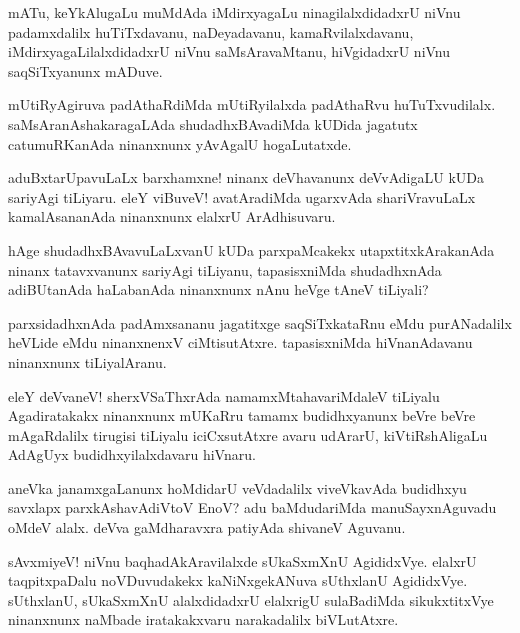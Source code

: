\begin{mng}
mATu, keYkAlugaLu muMdAda iMdirxyagaLu ninagilalxdidadxrU niVnu padamxdalilx huTiTxdavanu, naDeyadavanu, kamaRvilalxdavanu, iMdirxyagaLilalxdidadxrU niVnu saMsAravaMtanu, hiVgidadxrU niVnu saqSiTxyanunx mADuve.
\end{mng}

\begin{mng}
mUtiRyAgiruva padAthaRdiMda mUtiRyilalxda padAthaRvu huTuTxvudilalx. saMsAranAshakaragaLAda shudadhxBAvadiMda kUDida jagatutx catumuRKanAda ninanxnunx yAvAgalU hogaLutatxde.
\end{mng}

\begin{mng}
aduBxtarUpavuLaLx barxhamxne! ninanx deVhavanunx deVvAdigaLU kUDa sariyAgi tiLiyaru. eleY viBuveV! avatAradiMda ugarxvAda shariVravuLaLx kamalAsananAda ninanxnunx elalxrU ArAdhisuvaru.
\end{mng}

\begin{mng}
hAge shudadhxBAvavuLaLxvanU kUDa parxpaMcakekx utapxtitxkArakanAda ninanx tatavxvanunx sariyAgi tiLiyanu, tapasisxniMda shudadhxnAda adiBUtanAda haLabanAda ninanxnunx nAnu heVge tAneV tiLiyali?
\end{mng}

\begin{mng}
parxsidadhxnAda padAmxsananu jagatitxge saqSiTxkataRnu eMdu purANadalilx heVLide eMdu ninanxnenxV ciMtisutAtxre. tapasisxniMda hiVnanAdavanu ninanxnunx tiLiyalAranu.
\end{mng}

\begin{mng}
eleY deVvaneV! sherxVSaThxrAda namamxMtahavariMdaleV tiLiyalu Agadiratakakx ninanxnunx mUKaRru tamamx budidhxyanunx beVre beVre mAgaRdalilx tirugisi tiLiyalu iciCxsutAtxre avaru udArarU, kiVtiRshAligaLu AdAgUyx budidhxyilalxdavaru hiVnaru.
\end{mng}

\begin{mng}
aneVka janamxgaLanunx hoMdidarU veVdadalilx viveVkavAda budidhxyu savxlapx parxkAshavAdiVtoV EnoV? adu baMdudariMda manuSayxnAguvadu oMdeV alalx. deVva gaMdharavxra patiyAda shivaneV Aguvanu. 
\end{mng}

\begin{mng}
sAvxmiyeV! niVnu baqhadAkAravilalxde sUkaSxmXnU AgididxVye. elalxrU taqpitxpaDalu noVDuvudakekx kaNiNxgekANuva sUthxlanU AgididxVye. sUthxlanU, sUkaSxmXnU alalxdidadxrU elalxrigU sulaBadiMda sikukxtitxVye ninanxnunx naMbade iratakakxvaru narakadalilx biVLutAtxre.
\end{mng}

